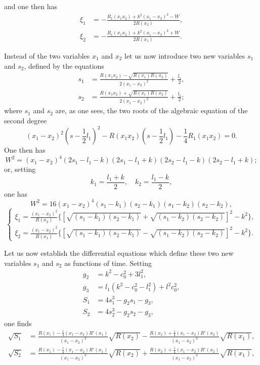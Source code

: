 \documentclass{article}
\begin{document}
and one then has
\begin{equation}
\begin{aligned}
\xi_1 &= -\frac{R_1(x_1x_2) + k^2(x_1 - x_2)^2 - W}{2R(x_2)}, \\
\xi_2 &= -\frac{R_1(x_1x_2) + k^2(x_1 - x_2)^2 + W}{2R(x_1)}.
\end{aligned}
\end{equation}

Instead of the two variables $x_1$ and $x_2$ let us now introduce two new variables $s_1$ and $s_2$, defined by the equations
\begin{equation}
\begin{aligned}
s_1 &= \frac{R(x_1x_2) - \sqrt{R(x_1)R(x_2)}}{2(x_1 - x_2)^2} + \frac{l_1}{2}, \\
s_2 &= \frac{R(x_1x_2) + \sqrt{R(x_1)R(x_2)}}{2(x_1 - x_2)^2} + \frac{l_1}{2};
\end{aligned}
\end{equation}
where $s_1$ and $s_2$ are, as one sees, the two roots of the algebraic equation of the second degree
\[
(x_1 - x_2)^2\left(s - \frac{1}{2}l_1\right)^2 - R(x_1x_2)\left(s - \frac{1}{2}l_1\right) - \frac{1}{4}R_1(x_1x_2) = 0.
\]
One then has
\[
W^2 = (x_1 - x_2)^4(2s_1 - l_1 - k)(2s_1 - l_1 + k)(2s_2 - l_1 - k)(2s_2 - l_1 + k);
\]
or, setting
\[
k_1 = \frac{l_1 + k}{2}, \quad k_2 = \frac{l_1 - k}{2},
\]
one has
\begin{equation}
W^2 = 16(x_1 - x_2)^4(s_1 - k_1)(s_2 - k_1)(s_1 - k_2)(s_2 - k_2),
\end{equation}
\begin{equation}
\begin{cases}
\displaystyle \xi_1 = \frac{(x_1 - x_2)^2}{R(x_2)}\{[\sqrt{(s_1 - k_1)(s_2 - k_1)} + \sqrt{(s_1 - k_2)(s_2 - k_2)}]^2 - k^2\}, \\[2ex]
\displaystyle \xi_2 = \frac{(x_1 - x_2)^2}{R(x_1)}\{[\sqrt{(s_1 - k_1)(s_2 - k_1)} - \sqrt{(s_1 - k_2)(s_2 - k_2)}]^2 - k^2\}.
\end{cases}
\end{equation}

Let us now establish the differential equations which define these two new variables $s_1$ and $s_2$ as functions of time.
Setting
\begin{equation}
\begin{aligned}
g_2 &= k^2 - c_0^2 + 3l_1^2, \\
g_3 &= l_1(k^2 - c_0^2 - l_1^2) + l^2c_0^2, \\
S_1 &= 4s_1^3 - g_2s_1 - g_3, \\
S_2 &= 4s_2^3 - g_2s_2 - g_3,
\end{aligned}
\end{equation}
one finds
\begin{align*}
\sqrt{S_1} &= \frac{R(x_1) - \frac{1}{4}(x_1 - x_2)R'(x_1)}{(x_1 - x_2)^3}\sqrt{R(x_2)} - \frac{R(x_2) + \frac{1}{4}(x_1 - x_2)R'(x_2)}{(x_1 - x_2)^3}\sqrt{R(x_1)}, \\
\sqrt{S_2} &= \frac{R(x_1) - \frac{1}{4}(x_1 - x_2)R'(x_1)}{(x_1 - x_2)^3}\sqrt{R(x_2)} + \frac{R(x_2) + \frac{1}{4}(x_1 - x_2)R'(x_2)}{(x_1 - x_2)^3}\sqrt{R(x_1)},
\end{align*}
\end{document}
